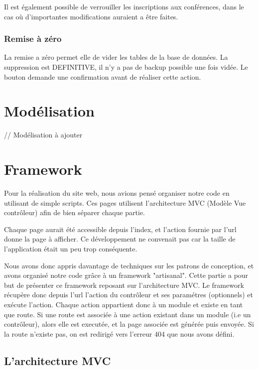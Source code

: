 Il est également possible de verrouiller les inscriptions aux conférences, dans le cas où d'importantes modifications
auraient a être faites.

            \subsubsection{Remise à zéro}

La remise a zéro permet elle de vider les tables de la base de données. La suppression est DEFINITIVE, il n'y a pas de
backup possible une fois vidée. Le bouton demande une confirmation avant de réaliser cette action.

    \section{Modélisation}

// Modélisation à ajouter

    \section{Framework}

Pour la réalisation du site web, nous avions pensé organiser notre code en utilisant de simple scripts.
Ces pages utilisent l'architecture MVC (Modèle Vue contrôleur) afin de bien séparer chaque partie.

Chaque page aurait été accessible depuis l'index, et l'action fournie par l'url donne la page à afficher.
Ce développement ne convenait pas car la taille de l'application était un peu trop conséquente.

Nous avons donc appris davantage de techniques sur les patrons de conception, et avons organisé notre code
grâce à un framework "artisanal". Cette partie a pour but de présenter ce framework reposant sur l'architecture MVC.
Le framework récupère donc depuis l'url l'action du contrôleur et ses paramétres (optionnels) et exécute l'action.
Chaque action appartient donc à un module et existe en tant que route. Si une route est associée à une action existant dans
un module (i.e un contrôleur), alors elle est executée, et la page associée est générée puis envoyée.
Si la route n'existe pas, on est redirigé vers l'erreur 404 que nous avons défini.

        \subsection{L'architecture MVC}

